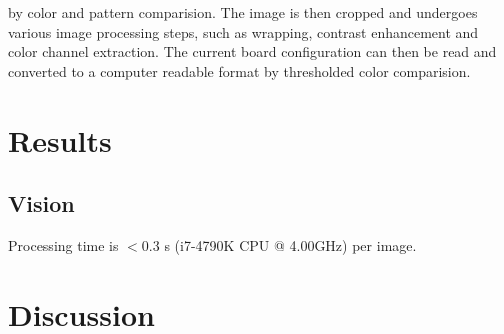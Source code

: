 \documentclass[10pt,twocolumn,letterpaper]{article}
\begin{document}
 by color and pattern comparision.
The image is then cropped and undergoes various image processing steps, such as wrapping, contrast enhancement and color channel extraction.
The current board configuration can then be read and converted to a computer readable format by thresholded color comparision.




\section{Results}

\subsection{Vision}
Processing time is $< 0.3$ s (i7-4790K CPU @ 4.00GHz) per image.


\section{Discussion}

{\small
\printbibliography
}
\end{document}

